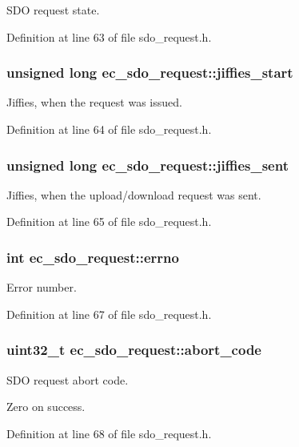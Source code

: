 S\-D\-O request state. 



Definition at line 63 of file sdo\-\_\-request.\-h.

\subsubsection[{jiffies\-\_\-start}]{\setlength{\rightskip}{0pt plus 5cm}unsigned long ec\-\_\-sdo\-\_\-request\-::jiffies\-\_\-start}\label{structec__sdo__request_aa5be223c362a630833451bd57471a05f}


Jiffies, when the request was issued. 



Definition at line 64 of file sdo\-\_\-request.\-h.

\subsubsection[{jiffies\-\_\-sent}]{\setlength{\rightskip}{0pt plus 5cm}unsigned long ec\-\_\-sdo\-\_\-request\-::jiffies\-\_\-sent}\label{structec__sdo__request_ad5d35e78085bce7e20a02753024e5822}


Jiffies, when the upload/download request was sent. 



Definition at line 65 of file sdo\-\_\-request.\-h.

\subsubsection[{errno}]{\setlength{\rightskip}{0pt plus 5cm}int ec\-\_\-sdo\-\_\-request\-::errno}\label{structec__sdo__request_a1119ddcb79a3deed62e3890481109030}


Error number. 



Definition at line 67 of file sdo\-\_\-request.\-h.

\subsubsection[{abort\-\_\-code}]{\setlength{\rightskip}{0pt plus 5cm}uint32\-\_\-t ec\-\_\-sdo\-\_\-request\-::abort\-\_\-code}\label{structec__sdo__request_aaa992ddb3f070824088161dffb347b3e}


S\-D\-O request abort code. 

Zero on success. 

Definition at line 68 of file sdo\-\_\-request.\-h.

